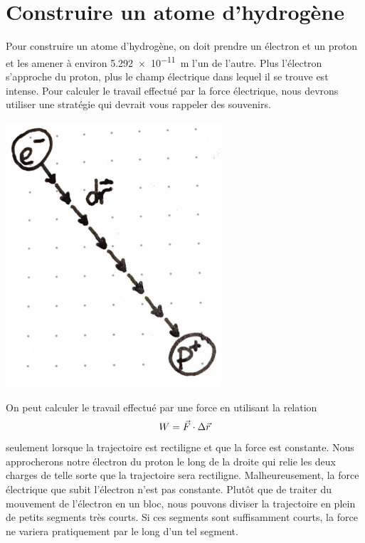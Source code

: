 \documentclass{tufte-handout}
\begin{document}
\newpage

\section{Construire un atome d'hydrogène}

Pour construire un atome d'hydrogène, on doit prendre un électron et un proton
et les amener à environ \SI{5.292e-11}{m} l'un de l'autre. Plus l'électron
s'approche du proton, plus le champ électrique dans lequel il se trouve est
intense. Pour calculer le travail effectué par la force électrique, nous
devrons utiliser une stratégie qui devrait vous rappeler des souvenirs.

\begin{marginfigure}
  \begin{center}
    \includegraphics[width=0.6\textwidth]{figures/hydrogen.pdf}
  \end{center}
\end{marginfigure}

On peut calculer le travail effectué par une force en utilisant la relation
\[W = \vec{F} \cdot \Delta\vec{r}\]
seulement lorsque la trajectoire est rectiligne et que la force est constante.
Nous approcherons notre électron du proton le long de la droite qui relie les
deux charges de telle sorte que la trajectoire sera rectiligne.
Malheureusement, la force électrique que subit l'électron n'est pas constante.
Plutôt que de traiter du mouvement de l'électron en un bloc, nous pouvons
diviser la trajectoire en plein de petits segments très courts. Si ces segments
sont suffisamment courts, la force ne variera pratiquement par le long d'un tel
segment.
\end{document}
